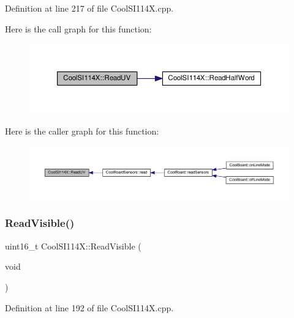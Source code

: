 Definition at line 217 of file Cool\+S\+I114\+X.\+cpp.

Here is the call graph for this function\+:
\nopagebreak
\begin{figure}[H]
\begin{center}
\leavevmode
\includegraphics[width=350pt]{class_cool_s_i114_x_a14ced664d74e93438440b0274109c111_cgraph}
\end{center}
\end{figure}
Here is the caller graph for this function\+:
\nopagebreak
\begin{figure}[H]
\begin{center}
\leavevmode
\includegraphics[width=350pt]{class_cool_s_i114_x_a14ced664d74e93438440b0274109c111_icgraph}
\end{center}
\end{figure}
\mbox{\label{class_cool_s_i114_x_a42e0e574256341443c647a4c0eda87d5}} 
\subsubsection{\texorpdfstring{Read\+Visible()}{ReadVisible()}}
{\footnotesize\ttfamily uint16\+\_\+t Cool\+S\+I114\+X\+::\+Read\+Visible (\begin{DoxyParamCaption}\item[{void}]{ }\end{DoxyParamCaption})}



Definition at line 192 of file Cool\+S\+I114\+X.\+cpp.

